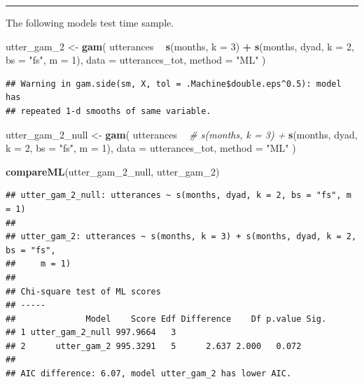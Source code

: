 \documentclass[]{article}
\newenvironment{Shaded}{\begin{snugshade}}{\end{snugshade}}
\newcommand{\CommentTok}[1]{\textcolor[rgb]{0.56,0.35,0.01}{\textit{#1}}}
\newcommand{\DataTypeTok}[1]{\textcolor[rgb]{0.13,0.29,0.53}{#1}}
\newcommand{\DecValTok}[1]{\textcolor[rgb]{0.00,0.00,0.81}{#1}}
\newcommand{\KeywordTok}[1]{\textcolor[rgb]{0.13,0.29,0.53}{\textbf{#1}}}
\newcommand{\NormalTok}[1]{#1}
\newcommand{\OperatorTok}[1]{\textcolor[rgb]{0.81,0.36,0.00}{\textbf{#1}}}
\newcommand{\StringTok}[1]{\textcolor[rgb]{0.31,0.60,0.02}{#1}}
\begin{document}
\begin{center}\rule{0.5\linewidth}{\linethickness}\end{center}

The following models test time sample.

\begin{Shaded}
\begin{Highlighting}[]
\NormalTok{utter_gam_}\DecValTok{2}\NormalTok{ <-}\StringTok{ }\KeywordTok{gam}\NormalTok{(}
\NormalTok{  utterances }\OperatorTok{~}
\StringTok{    }\KeywordTok{s}\NormalTok{(months, }\DataTypeTok{k =} \DecValTok{3}\NormalTok{) }\OperatorTok{+}
\StringTok{    }\KeywordTok{s}\NormalTok{(months, dyad, }\DataTypeTok{k =} \DecValTok{2}\NormalTok{, }\DataTypeTok{bs =} \StringTok{"fs"}\NormalTok{, }\DataTypeTok{m =} \DecValTok{1}\NormalTok{),}
  \DataTypeTok{data =}\NormalTok{ utterances_tot,}
  \DataTypeTok{method =} \StringTok{"ML"}
\NormalTok{)}
\end{Highlighting}
\end{Shaded}

\begin{verbatim}
## Warning in gam.side(sm, X, tol = .Machine$double.eps^0.5): model has
## repeated 1-d smooths of same variable.
\end{verbatim}

\begin{Shaded}
\begin{Highlighting}[]
\NormalTok{utter_gam_}\DecValTok{2}\NormalTok{_null <-}\StringTok{ }\KeywordTok{gam}\NormalTok{(}
\NormalTok{  utterances }\OperatorTok{~}
\StringTok{    }\CommentTok{# s(months, k = 3) +}
\StringTok{    }\KeywordTok{s}\NormalTok{(months, dyad, }\DataTypeTok{k =} \DecValTok{2}\NormalTok{, }\DataTypeTok{bs =} \StringTok{"fs"}\NormalTok{, }\DataTypeTok{m =} \DecValTok{1}\NormalTok{),}
  \DataTypeTok{data =}\NormalTok{ utterances_tot,}
  \DataTypeTok{method =} \StringTok{"ML"}
\NormalTok{)}

\KeywordTok{compareML}\NormalTok{(utter_gam_}\DecValTok{2}\NormalTok{_null, utter_gam_}\DecValTok{2}\NormalTok{)}
\end{Highlighting}
\end{Shaded}

\begin{verbatim}
## utter_gam_2_null: utterances ~ s(months, dyad, k = 2, bs = "fs", m = 1)
## 
## utter_gam_2: utterances ~ s(months, k = 3) + s(months, dyad, k = 2, bs = "fs", 
##     m = 1)
## 
## Chi-square test of ML scores
## -----
##              Model    Score Edf Difference    Df p.value Sig.
## 1 utter_gam_2_null 997.9664   3                              
## 2      utter_gam_2 995.3291   5      2.637 2.000   0.072     
## 
## AIC difference: 6.07, model utter_gam_2 has lower AIC.
\end{verbatim}
\end{document}
